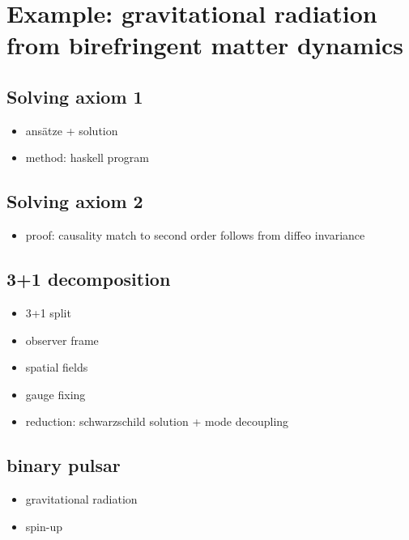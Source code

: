 \chapter{Example: gravitational radiation from birefringent matter dynamics}

\section{Solving axiom 1}
\begin{itemize}
\item ansätze + solution
\item method: haskell program
\end{itemize}

\section{Solving axiom 2}
\begin{itemize}
\item proof: causality match to second order follows from diffeo invariance
\end{itemize}

\section{3+1 decomposition}
\begin{itemize}
\item 3+1 split
\item observer frame
\item spatial fields
\item gauge fixing
\item reduction: schwarzschild solution + mode decoupling
\end{itemize}

\section{binary pulsar}
\begin{itemize}
\item gravitational radiation
\item spin-up
\end{itemize}

